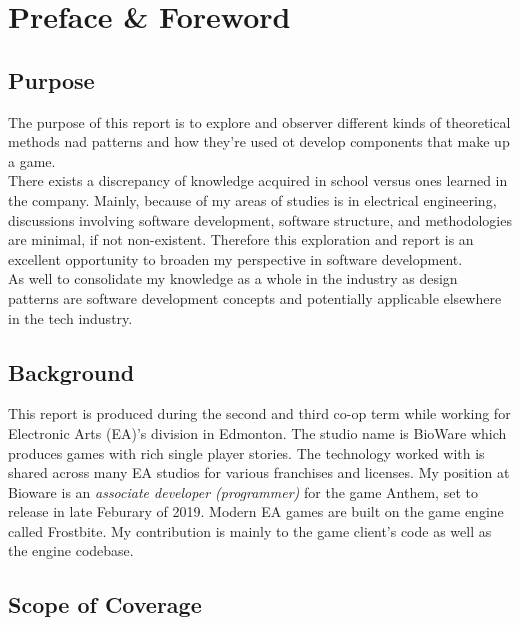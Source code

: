 
\section*{Preface \& Foreword}

\subsection*{Purpose}

The purpose of this report is to explore and observer different kinds of theoretical methods nad patterns and how they're used ot develop components that make up a game.\bs
\\
There exists a discrepancy of knowledge acquired in school versus ones learned in the company. Mainly, because of my areas of studies is in electrical engineering, discussions involving software development, software structure, and methodologies are minimal, if not non-existent. Therefore this exploration and report is an excellent opportunity to broaden my perspective in software development.\bs
\\
As well to consolidate my knowledge as a whole in the industry as design patterns are software development concepts and potentially applicable elsewhere in the tech industry.

\subsection*{Background}

This report is produced during the second and third co-op term while working for Electronic Arts (EA)'s division in Edmonton. The studio name is BioWare which produces games with rich single player stories. The technology worked with is shared across many EA studios for various franchises and licenses. My position at Bioware is an \textit{associate developer (programmer)} for the game Anthem, set to release in late Feburary of 2019. Modern EA games are built on the game engine called Frostbite. My contribution is mainly to the game client's code as well as the engine codebase.

\subsection*{Scope of Coverage}

